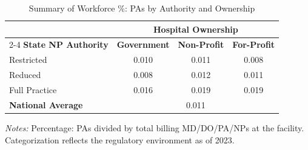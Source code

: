 \begin{table}[htbp]
    \centering
    \caption{Summary of Workforce \%: PAs by Authority and Ownership}
    \label{tab:pct_pa_own}
    \vspace{0.2cm}
    \begin{tabular}{lccc}
        \toprule
        & \multicolumn{3}{c}{\textbf{Hospital Ownership}} \\
        \cmidrule(lr){2-4}
        \textbf{State NP Authority} & \textbf{Government} & \textbf{Non-Profit} & \textbf{For-Profit} \\
        \midrule
        Restricted & 0.010 & 0.011 & 0.008 \\
        Reduced & 0.008 & 0.012 & 0.011 \\
        Full Practice & 0.016 & 0.019 & 0.019 \\
        \midrule
        \textbf{National Average} & \multicolumn{3}{c}{0.011} \\
        \bottomrule
    \end{tabular}
    \vspace{0.1cm}
    \begin{minipage}{0.85\textwidth}
        \footnotesize \textit{Notes:} Percentage: PAs divided by total billing MD/DO/PA/NPs at the facility. Categorization reflects the regulatory environment as of 2023.
    \end{minipage}
\end{table}